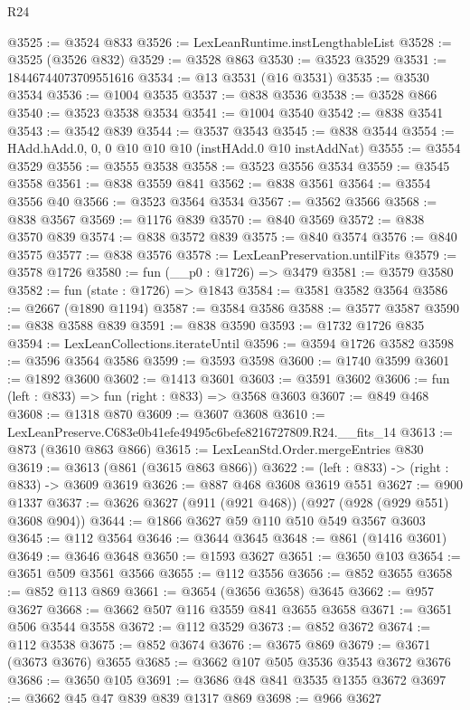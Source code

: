 \begin{lexlean}{R24}
\begin{coremodule}
@3525 := @3524 @833
@3526 := LexLeanRuntime.instLengthableList
@3528 := @3525 (@3526 @832)
@3529 := @3528 @863
@3530 := @3523 @3529
@3531 := 18446744073709551616
@3534 := @13 @3531 (@16 @3531)
@3535 := @3530 @3534
@3536 := @1004 @3535
@3537 := @838 @3536
@3538 := @3528 @866
@3540 := @3523 @3538 @3534
@3541 := @1004 @3540
@3542 := @838 @3541
@3543 := @3542 @839
@3544 := @3537 @3543
@3545 := @838 @3544
@3554 := HAdd.hAdd.{0, 0, 0} @10 @10 @10 (instHAdd.{0} @10 instAddNat)
@3555 := @3554 @3529
@3556 := @3555 @3538
@3558 := @3523 @3556 @3534
@3559 := @3545 @3558
@3561 := @838 @3559 @841
@3562 := @838 @3561
@3564 := @3554 @3556 @40
@3566 := @3523 @3564 @3534
@3567 := @3562 @3566
@3568 := @838 @3567
@3569 := @1176 @839
@3570 := @840 @3569
@3572 := @838 @3570 @839
@3574 := @838 @3572 @839
@3575 := @840 @3574
@3576 := @840 @3575
@3577 := @838 @3576
@3578 := LexLeanPreservation.untilFits
@3579 := @3578 @1726
@3580 := fun (__p0 : @1726) => @3479
@3581 := @3579 @3580
@3582 := fun (state : @1726) => @1843
@3584 := @3581 @3582 @3564
@3586 := @2667 (@1890 @1194)
@3587 := @3584 @3586
@3588 := @3577 @3587
@3590 := @838 @3588 @839
@3591 := @838 @3590
@3593 := @1732 @1726 @835
@3594 := LexLeanCollections.iterateUntil
@3596 := @3594 @1726 @3582
@3598 := @3596 @3564 @3586
@3599 := @3593 @3598
@3600 := @1740 @3599
@3601 := @1892 @3600
@3602 := @1413 @3601
@3603 := @3591 @3602
@3606 := fun (left : @833) => fun (right : @833) => @3568 @3603
@3607 := @849 @468
@3608 := @1318 @870
@3609 := @3607 @3608
@3610 := LexLeanPreserve.C683e0b41efe49495c6befe8216727809.R24.__fits_14
@3613 := @873 (@3610 @863 @866)
@3615 := LexLeanStd.Order.mergeEntries @830
@3619 := @3613 (@861 (@3615 @863 @866))
@3622 := (left : @833) -> (right : @833) -> @3609 @3619
@3626 := @887 @468 @3608 @3619 @551
@3627 := @900 @1337
@3637 := @3626 @3627 (@911 (@921 @468)) (@927 (@928 (@929 @551) @3608 @904))
@3644 := @1866 @3627 @59 @110 @510 @549 @3567 @3603
@3645 := @112 @3564
@3646 := @3644 @3645
@3648 := @861 (@1416 @3601)
@3649 := @3646 @3648
@3650 := @1593 @3627
@3651 := @3650 @103
@3654 := @3651 @509 @3561 @3566
@3655 := @112 @3556
@3656 := @852 @3655
@3658 := @852 @113 @869
@3661 := @3654 (@3656 @3658) @3645
@3662 := @957 @3627
@3668 := @3662 @507 @116 @3559 @841 @3655 @3658
@3671 := @3651 @506 @3544 @3558
@3672 := @112 @3529
@3673 := @852 @3672
@3674 := @112 @3538
@3675 := @852 @3674
@3676 := @3675 @869
@3679 := @3671 (@3673 @3676) @3655
@3685 := @3662 @107 @505 @3536 @3543 @3672 @3676
@3686 := @3650 @105
@3691 := @3686 @48 @841 @3535 @1355 @3672
@3697 := @3662 @45 @47 @839 @839 @1317 @869
@3698 := @966 @3627

\end{coremodule}
\end{lexlean}
